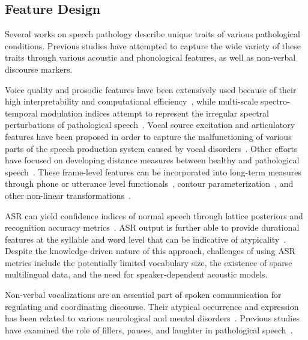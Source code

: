 \documentclass{article}
\begin{document}
\subsection{Feature Design}
Several works on speech pathology \cite{lass1989speech,berry1942speech,wingate1964standard} describe unique traits of various pathological conditions. 
Previous studies have attempted to capture the wide variety of these traits through various acoustic and phonological features, as well as non-verbal discourse markers.

Voice quality and prosodic features have been extensively used because of their high interpretability and computational efficiency~\cite{van2010computational,tsanas2012novel,bone2014psychologist}, while multi-scale spectro-temporal modulation indices attempt to represent the irregular spectral perturbations of pathological speech~\cite{liss2010discriminating,falk2012characterization,williamson2015automatic}. Vocal source excitation and articulatory features have been proposed in order to capture the malfunctioning of various parts of the speech production system caused by vocal disorders~\cite{falk2012characterization,hahm2015parkinson}. Other efforts have focused on developing distance measures between healthy and pathological speech~\cite{gu2005disordered}. These frame-level features can be incorporated into long-term measures through phone or utterance level functionals~\cite{kim2015automatic}, contour parameterization~\cite{kim2015automatic2}, and other non-linear transformations~\cite{kim2015automatic,an2015automatic,middag2011combining}.

ASR can yield confidence indices of normal speech through lattice posteriors and recognition accuracy metrics~\cite{kim2015automatic,zlotnik2015random,maier2009peaks,sharma2009universal,middag2009automated}. ASR output is further able to provide durational features at the syllable and word level that can be indicative of atypicality~\cite{an2015automatic,duez2006consonant}. Despite the knowledge-driven nature of this approach, challenges of using ASR metrics include the potentially limited vocabulary size, the existence of sparse multilingual data, and the need for speaker-dependent acoustic models.

Non-verbal vocalizations are an essential part of spoken communication for regulating and coordinating discourse. Their atypical occurrence and expression has been related to various neurological and mental disorders~\cite{lake2011listener}. Previous studies have examined the role of fillers, pauses, and laughter in pathological speech~\cite{heeman2010autism,lake2011listener,gupta2014predicting}.
\end{document}
